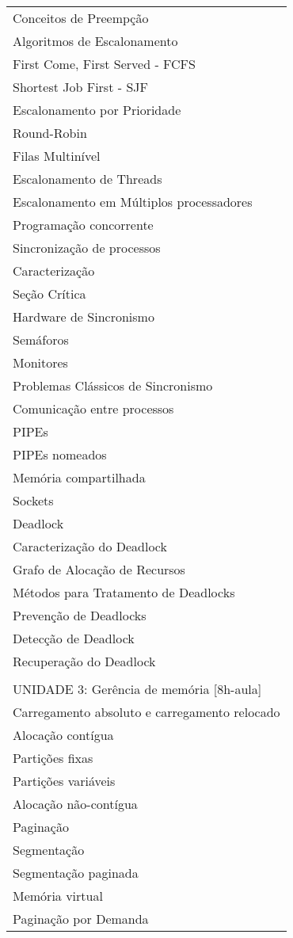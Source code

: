 \documentclass[12pt]{article}
\begin{document}
\begin{longtable}{|L{1.025\textwidth}|}
Conceitos de Preempção\\
Algoritmos de Escalonamento\\
First Come, First Served - FCFS\\
Shortest Job First - SJF\\
Escalonamento por Prioridade\\
Round-Robin\\
Filas Multinível\\
Escalonamento de Threads\\
Escalonamento em Múltiplos processadores\\
Programação concorrente\\
Sincronização de processos\\
Caracterização\\
Seção Crítica\\
Hardware de Sincronismo\\
Semáforos\\
Monitores\\
Problemas Clássicos de Sincronismo\\
Comunicação entre processos\\
PIPEs\\
PIPEs nomeados\\
Memória compartilhada\\
Sockets\\
Deadlock\\
Caracterização do Deadlock\\
Grafo de Alocação de Recursos\\
Métodos para Tratamento de Deadlocks\\
Prevenção de Deadlocks\\
Detecção de Deadlock\\
Recuperação do Deadlock\\
\\
UNIDADE 3: Gerência de memória [8h-aula]\\
Carregamento absoluto e carregamento relocado\\
Alocação contígua\\
Partições fixas\\
Partições variáveis\\
Alocação não-contígua\\
Paginação\\
Segmentação\\
Segmentação paginada\\
Memória virtual\\
Paginação por Demanda\\

\end{longtable}
\end{document}
